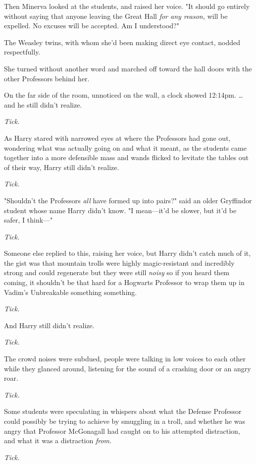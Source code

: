 Then Minerva looked at the students, and raised her voice. "It should go entirely without saying that anyone leaving the Great Hall \emph{for any reason,} will be expelled. No excuses will be accepted. Am I understood?"

The Weasley twins, with whom she'd been making direct eye contact, nodded respectfully.

She turned without another word and marched off toward the hall doors with the other Professors behind her.

On the far side of the room, unnoticed on the wall, a clock showed 12:14pm.
\sbreak
{\ldots}and he still didn't realize.

\emph{Tick.}

As Harry stared with narrowed eyes at where the Professors had gone out, wondering what was actually going on and what it meant, as the students came together into a more defensible mass and wands flicked to levitate the tables out of their way, Harry still didn't realize.

\emph{Tick.}

"Shouldn't the Professors \emph{all} have formed up into pairs?" said an older Gryffindor student whose name Harry didn't know. "I mean---it'd be slower, but it'd be safer, I think---"

\emph{Tick.}

Someone else replied to this, raising her voice, but Harry didn't catch much of it, the gist was that mountain trolls were highly magic-resistant and incredibly strong and could regenerate but they were still \emph{noisy} so if you heard them coming, it shouldn't be that hard for a Hogwarts Professor to wrap them up in Vadim's Unbreakable something something.

\emph{Tick.}

And Harry still didn't realize.

\emph{Tick.}

The crowd noises were subdued, people were talking in low voices to each other while they glanced around, listening for the sound of a crashing door or an angry roar.

\emph{Tick.}

Some students were speculating in whispers about what the Defense Professor could possibly be trying to achieve by smuggling in a troll, and whether he was angry that Professor McGonagall had caught on to his attempted distraction, and what it was a distraction \emph{from.}

\emph{Tick.}

